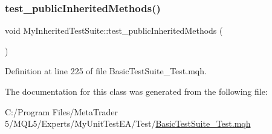 \mbox{\label{class_my_inherited_test_suite_a1a6a926a8fb9d03618008b6d882a1cfe}} 
\subsubsection{\texorpdfstring{test\+\_\+public\+Inherited\+Methods()}{test\_publicInheritedMethods()}}
{\footnotesize\ttfamily void My\+Inherited\+Test\+Suite\+::test\+\_\+public\+Inherited\+Methods (\begin{DoxyParamCaption}{ }\end{DoxyParamCaption})\hspace{0.3cm}{\ttfamily [inline]}}



Definition at line 225 of file Basic\+Test\+Suite\+\_\+\+Test.\+mqh.



The documentation for this class was generated from the following file\+:\begin{DoxyCompactItemize}
\item 
C\+:/\+Program Files/\+Meta\+Trader 5/\+M\+Q\+L5/\+Experts/\+My\+Unit\+Test\+E\+A/\+Test/\mbox{\hyperlink{_basic_test_suite___test_8mqh}{Basic\+Test\+Suite\+\_\+\+Test.\+mqh}}\end{DoxyCompactItemize}
